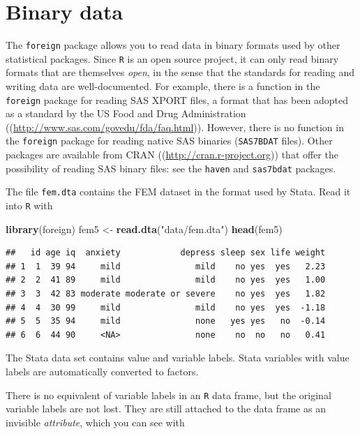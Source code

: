 \documentclass[
]{book}
\newenvironment{Shaded}{\begin{snugshade}}{\end{snugshade}}
\newcommand{\FunctionTok}[1]{\textcolor[rgb]{0.13,0.29,0.53}{\textbf{#1}}}
\newcommand{\NormalTok}[1]{#1}
\newcommand{\OtherTok}[1]{\textcolor[rgb]{0.56,0.35,0.01}{#1}}
\newcommand{\StringTok}[1]{\textcolor[rgb]{0.31,0.60,0.02}{#1}}
\newcounter{none} %
\theoremstyle{definition}
\theoremstyle{definition}
\theoremstyle{definition}
\theoremstyle{definition}
\theoremstyle{remark}
\begin{document}
\section{Binary data}\label{binary-data}

The \texttt{foreign} package allows you to read data in binary formats
used by other statistical packages. Since \texttt{R} is an open source
project, it can only read binary formats that are themselves \emph{open},
in the sense that the standards for reading and writing data are
well-documented. For example, there is a function in the
\texttt{foreign} package for reading SAS XPORT files, a format that
has been adopted as a standard by the US Food and Drug Administration
((\url{http://www.sas.com/govedu/fda/faq.html})). However, there is no
function in the \texttt{foreign} package for reading native SAS
binaries (\texttt{SAS7BDAT} files). Other packages are available from
CRAN ((\url{http://cran.r-project.org})) that offer the possibility of
reading SAS binary files: see the \texttt{haven} and \texttt{sas7bdat}
packages.

The file \texttt{fem.dta} contains the FEM dataset in the format
used by Stata. Read it into \texttt{R} with

\begin{Shaded}
\begin{Highlighting}[]
\FunctionTok{library}\NormalTok{(foreign)}
\NormalTok{fem5 }\OtherTok{\textless{}{-}} \FunctionTok{read.dta}\NormalTok{(}\StringTok{"data/fem.dta"}\NormalTok{)}
\FunctionTok{head}\NormalTok{(fem5)}
\end{Highlighting}
\end{Shaded}

\begin{verbatim}
##   id age iq  anxiety            depress sleep sex life weight
## 1  1  39 94     mild               mild    no yes  yes   2.23
## 2  2  41 89     mild               mild    no yes  yes   1.00
## 3  3  42 83 moderate moderate or severe    no yes  yes   1.82
## 4  4  30 99     mild               mild    no yes  yes  -1.18
## 5  5  35 94     mild               none   yes yes   no  -0.14
## 6  6  44 90     <NA>               none    no  no   no   0.41
\end{verbatim}

The Stata data set contains value and variable labels.
Stata variables with value labels are automatically converted to
factors.

There is no equivalent of variable labels in an \texttt{R} data frame,
but the original variable labels are not lost. They are still attached
to the data frame as an invisible \emph{attribute}, which you can see
with
\end{document}
